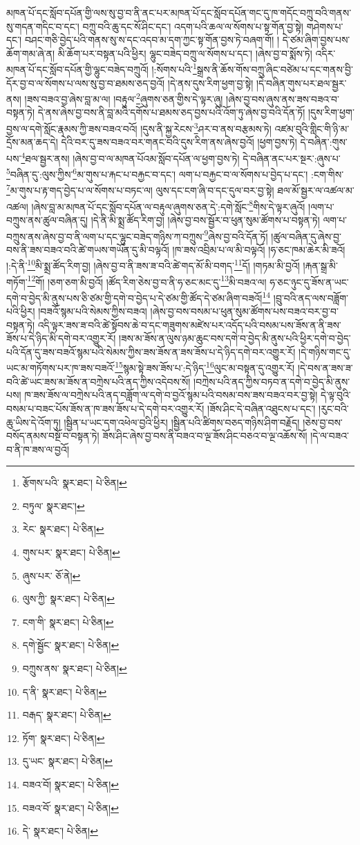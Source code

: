 མཁན་པོ་དང་སློབ་དཔོན་གྱི་ལས་སུ་བྱ་བ་ནི་ནང་པར་མཁན་པོ་དང་སློབ་དཔོན་གང་དུ་ཁ་གདོང་བཀྲུ་བའི་གནས་སུ་གདན་གདིང་བ་དང་། བཀྲུ་བའི་ཆུ་དང་སོ་ཤིང་དང་། འདག་པའི་ཆལ་ལ་སོགས་པ་སྟ་གོན་བྱ་སྟེ། གཤེགས་པ་དང་། བཤང་གཅི་བྱེད་པའི་གནས་སུ་ས་དང་འདབ་མ་དག་ཀྱང་སྟ་གོན་བྱས་ཏེ་བཞག་གོ། །
དེ་ཙམ་ཞིག་བྱས་པས་ཆོག་གམ་ཞེ་ན། མི་ཆོག་པར་བསྟན་པའི་ཕྱིར། ལྷུང་བཟེད་བཀྲུ་ལ་སོགས་པ་དང་། །ཞེས་བྱ་བ་སྨོས་ཏེ། འདིར་མཁན་པོ་དང་སློབ་དཔོན་གྱི་ལྷུང་བཟེད་བཀྲུའོ། །:སོགས་པའི་\footnote{རྩོགས་པའི་  སྣར་ཐང་།  པེ་ཅིན། }སྒྲས་ནི་ཆོས་གོས་བཀྲུ་ཞིང་བཙེམ་པ་དང་གནས་བྱི་དོར་བྱ་བ་ལ་སོགས་པ་ལས་སུ་བྱ་བ་ཐམས་ཅད་བྱའོ། །དེ་ནས་དུས་རིག་ཕྱག་བྱ་སྟེ། །དེ་བཞིན་གུས་པར་ཐལ་སྦྱར་ནས། །ཟས་བཟའ་བྱ་ཞེས་བླ་མ་ལ། །བརྟུལ་\footnote{བཏུལ་  སྣར་ཐང་། }ཞུགས་ཅན་གྱིས་དེ་ལྟར་ཞུ། །ཞེས་བྱ་བས་ཞུས་ནས་ཟས་བཟའ་བ་བསྟན་ཏེ། དེ་ནས་ཞེས་བྱ་བས་ནི་བླ་མའི་དགོས་པ་ཐམས་ཅད་བྱས་པའི་འོག་ཏུ་ཞེས་བྱ་བའི་དོན་ཏོ། །དུས་རིག་ཕྱག་བྱས་ལ་དགེ་སློང་རྣམས་ཀྱི་ཟས་བཟའ་བའོ། །དུས་ནི་སྐྱ་རེངས་\footnote{རེང་  སྣར་ཐང་།  པེ་ཅིན། }ཤར་བ་ནས་བརྩམས་ཏེ། འཛམ་བུའི་གླིང་གི་ཉི་མ་དྲོས་མན་ཆད་དེ། དེའི་བར་དུ་ཟས་བཟའ་བར་གནང་བའི་དུས་རིག་ནས་ཞེས་བྱའོ། །ཕྱག་བྱས་ཏེ། དེ་བཞིན་:གུས་པས་\footnote{གུས་པར་  སྣར་ཐང་།  པེ་ཅིན། }ཐལ་སྦྱར་ནས། །ཞེས་བྱ་བ་ལ་མཁན་པོའམ་སློབ་དཔོན་ལ་ཕྱག་བྱས་ཏེ། དེ་བཞིན་ནང་པར་སྔར་:ཞུས་པ་\footnote{ཞུས་པར་  ཅོ་ནེ། }བཞིན་དུ་:ལུས་ཀྱིས་\footnote{ལུས་ཀྱི་  སྣར་ཐང་།  པེ་ཅིན། }མ་གུས་པ་རྐང་པ་བརྐྱང་བ་དང་། ལག་པ་བརྐྱང་བ་ལ་སོགས་པ་བྱེད་པ་དང་། :ངག་གིས་\footnote{ངག་གི་  སྣར་ཐང་།  པེ་ཅིན། }མ་གུས་པ་རྟ་གད་བྱེད་པ་ལ་སོགས་པ་བཏང་ལ། ལུས་དང་ངག་ཞི་བ་དང་དུལ་བར་བྱ་སྟེ། ཐལ་མོ་སྦྱར་ལ་འཚལ་མ་འཚལ། །ཞེས་བླ་མ་མཁན་པོ་དང་སློབ་དཔོན་ལ་བརྟུལ་ཞུགས་ཅན་དེ་:དགེ་སློང་\footnote{དགེ་སྦྱོང་  སྣར་ཐང་།  པེ་ཅིན། }གིས་དེ་ལྟར་ཞུའོ། །ལག་པ་བཀྲུས་ནས་ཚུལ་བཞིན་དུ། །དེ་ནི་མི་སྨྲ་ཚོད་རིག་བྱ། །ཞེས་བྱ་བས་སྦྱོར་བ་ཕུན་སུམ་ཚོགས་པ་བསྟན་ཏེ། ལག་པ་བཀྲུས་ནས་ཞེས་བྱ་བ་ནི་ལག་པ་དང་ལྷུང་བཟེད་གཉིས་ཀ་བཀྲུས་\footnote{བཀྲུས་ནས་  སྣར་ཐང་།  པེ་ཅིན། }ཞེས་བྱ་བའི་དོན་ཏོ། །ཚུལ་བཞིན་དུ་ཞེས་བྱ་བས་ནི་ཟས་བཟའ་བའི་ཚེ་གཡས་གཡོན་དུ་མི་བལྟའོ། །ཁ་ཟས་འབྲིམ་པ་ལ་མི་བལྟའོ། །ཧ་ཅང་ཁམ་ཆེར་མི་ཟའོ། །:དེ་ནི་\footnote{ད་ནི་  སྣར་ཐང་།  པེ་ཅིན། }མི་སྨྲ་ཚོད་རིག་བྱ། །ཞེས་བྱ་བ་ནི་ཟས་ཟ་བའི་ཚེ་གད་མོ་མི་བགད་\footnote{བརྒད་  སྣར་ཐང་།  པེ་ཅིན། }དོ། །གཏམ་མི་བྱའོ། །རྐན་སྒྲ་མི་གཏོག་\footnote{ཏོག་  སྣར་ཐང་།  པེ་ཅིན། }གོ། །ཅག་ཅག་མི་བྱའོ། །ཚོད་རིག་ཅེས་བྱ་བ་ནི་ཧ་ཅང་མང་དུ་\footnote{དུ་ཡང་  སྣར་ཐང་།  པེ་ཅིན། }མི་བཟའ་ལ། ཧ་ཅང་ཉུང་དུ་ཟོས་ན་ཡང་དགེ་བ་བྱེད་མི་ནུས་པས་ཅི་ཙམ་གྱི་དགེ་བ་བྱེད་པ་དེ་ཙམ་གྱི་ཚོད་དེ་ཙམ་ཞིག་བཟའོ།\footnote{བཟའ་བོ།  སྣར་ཐང་།  པེ་ཅིན། } །བྲུ་བའི་ནད་ལས་བཟློག་པའི་ཕྱིར། །བཟའོ་སྙམ་པའི་སེམས་ཀྱིས་བཟའ། །ཞེས་བྱ་བས་བསམ་པ་ཕུན་སུམ་ཚོགས་པས་བཟའ་བར་བྱ་བ་བསྟན་ཏེ། འདི་ལྟར་ཟས་ཟ་བའི་ཚེ་སྟོབས་ཆེ་བ་དང་གཟུགས་མཛེས་པར་འདོད་པའི་བསམ་པས་ཟོས་ན་ནི་ཟས་ཟོས་པ་དེ་ཉིད་མི་དགེ་བར་འགྱུར་རོ། །ཟས་མ་ཟོས་ན་ལུས་ཉམ་ཆུང་བས་དགེ་བ་བྱེད་མི་ནུས་པའི་ཕྱིར་དགེ་བ་བྱེད་པའི་དོན་དུ་ཟས་བཟའོ་སྙམ་པའི་སེམས་ཀྱིས་ཟས་ཟོས་ན་ཟས་ཟོས་པ་དེ་ཉིད་དགེ་བར་འགྱུར་རོ། །དེ་གཉིས་གང་དུ་ཡང་མ་གཏོགས་པར་ཁ་ཟས་བཟའོ་\footnote{བཟའ་བོ་  སྣར་ཐང་།  པེ་ཅིན། }སྙམ་སྟེ་ཟས་ཟོས་པ་:དེ་ཉིད་\footnote{དེ་  སྣར་ཐང་།  པེ་ཅིན། }ལུང་མ་བསྟན་དུ་འགྱུར་རོ། །དེ་བས་ན་ཟས་ཟ་བའི་ཚེ་ཡང་ཟས་མ་ཟོས་ན་བཀྲེས་པའི་ནད་ཀྱིས་འདེབས་སོ། །བཀྲེས་པའི་ནད་ཀྱིས་བཏབ་ན་དགེ་བ་བྱེད་མི་ནུས་པས། ཁ་ཟས་ཟོས་ལ་བཀྲེས་པའི་ནད་བཟློག་ལ་དགེ་བ་བྱའོ་སྙམ་པའི་བསམ་བས་ཟས་བཟའ་བར་བྱ་སྟེ། དེ་ལྟ་བུའི་བསམ་པ་བཟང་པོས་ཟོས་ན་ཁ་ཟས་ཟོས་པ་དེ་དགེ་བར་འགྱུར་རོ། །ཟོས་ཤིང་དེ་བཞིན་འཐུངས་པ་དང་། །རུང་བའི་ཆུ་ཡིས་དེ་འོག་ཏུ། །སྦྱིན་པ་ཡང་དག་འཕེལ་བྱའི་ཕྱིར། །སྦྱིན་པའི་ཚིགས་བཅད་གཉིས་ཤིག་བརྗོད། །ཅེས་བྱ་བས་བསོད་ནམས་བསྔོ་བ་བསྟན་ཏེ། ཟོས་ཤིང་ཞེས་བྱ་བས་ནི་བཟའ་བ་ལྔ་ཟོས་ཤིང་བཅའ་བ་ལྔ་འཆོས་སོ། །དེ་ལ་བཟའ་བ་ནི་ཁ་ཟས་ལ་བྱའོ། 